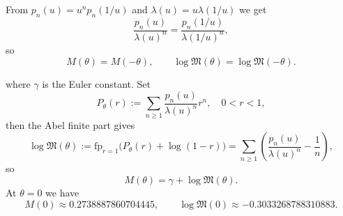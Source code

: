 \begin{proposition}\label{prop:mertens-even}
From $p_n(u)=u^n p_n(1/u)$ and $\lambda(u)=u\lambda(1/u)$ we get
\[
\frac{p_n(u)}{\lambda(u)^n}=\frac{p_n(1/u)}{\lambda(1/u)^n},
\]
so
\[
M(\theta)=M(-\theta),\qquad
\log\mathfrak{M}(\theta)=\log\mathfrak{M}(-\theta).
\]
\end{proposition}
where $\gamma$ is the Euler constant. Set
\[
P_\theta(r):=\sum_{n\ge 1}\frac{p_n(u)}{\lambda(u)^n}r^n,\quad 0<r<1,
\]
then the Abel finite part gives
\[
\log\mathfrak{M}(\theta):=\mathrm{fp}_{r=1}\bigl(P_\theta(r)+\log(1-r)\bigr)
=\sum_{n\ge 1}\left(\frac{p_n(u)}{\lambda(u)^n}-\frac{1}{n}\right),
\]
so
\[
M(\theta)=\gamma+\log\mathfrak{M}(\theta).
\]
At $\theta=0$ we have
\[
M(0)\approx 0.2738887860704445,\qquad
\log\mathfrak{M}(0)\approx -0.3033268788310883.
\]
